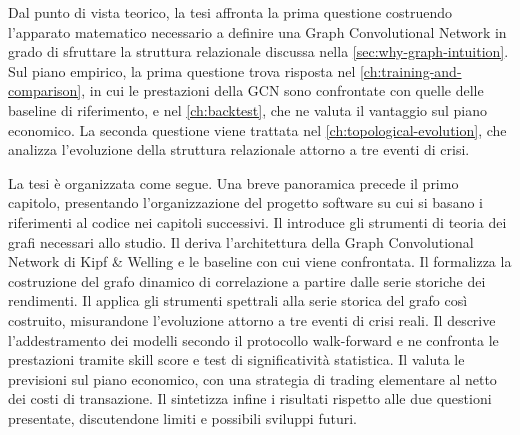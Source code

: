 Dal punto di vista teorico, la tesi affronta la prima questione costruendo l'apparato matematico necessario a definire una Graph Convolutional Network in grado di sfruttare la struttura relazionale discussa nella \cref{sec:why-graph-intuition}. Sul piano empirico, la prima questione trova risposta nel \cref{ch:training-and-comparison}, in cui le prestazioni della GCN sono confrontate con quelle delle baseline di riferimento, e nel \cref{ch:backtest}, che ne valuta il vantaggio sul piano economico. La seconda questione viene trattata nel \cref{ch:topological-evolution}, che analizza l'evoluzione della struttura relazionale attorno a tre eventi di crisi.

La tesi è organizzata come segue. Una breve panoramica precede il primo capitolo, presentando l'organizzazione del progetto software su cui si basano i riferimenti al codice nei capitoli successivi. Il  introduce gli strumenti di teoria dei grafi necessari allo studio. Il  deriva l'architettura della Graph Convolutional Network di Kipf \& Welling e le baseline con cui viene confrontata. Il  formalizza la costruzione del grafo dinamico di correlazione a partire dalle serie storiche dei rendimenti. Il  applica gli strumenti spettrali alla serie storica del grafo così costruito, misurandone l'evoluzione attorno a tre eventi di crisi reali. Il  descrive l'addestramento dei modelli secondo il protocollo walk-forward e ne confronta le prestazioni tramite skill score e test di significatività statistica. Il  valuta le previsioni sul piano economico, con una strategia di trading elementare al netto dei costi di transazione. Il  sintetizza infine i risultati rispetto alle due questioni presentate, discutendone limiti e possibili sviluppi futuri.

\let\thesection\oldthesection
